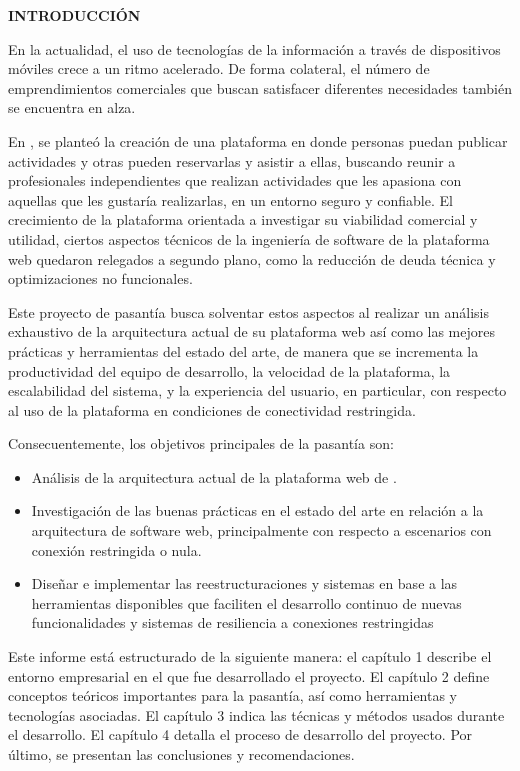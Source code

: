 \begin{center}
\textsc{\bfseries\uppercase{Introducción}}
\end{center}

En la actualidad, el uso de tecnologías de la información a través de dispositivos móviles crece a un ritmo acelerado. De forma colateral, el número de emprendimientos comerciales que buscan satisfacer diferentes necesidades también se encuentra en alza.

En \business, se planteó la creación de una plataforma en donde personas puedan publicar actividades y otras pueden reservarlas y asistir a ellas, buscando reunir a profesionales independientes que realizan actividades que les apasiona con aquellas que les gustaría realizarlas, en un entorno seguro y confiable. El crecimiento de la plataforma orientada a investigar su viabilidad comercial y utilidad, ciertos aspectos técnicos de la ingeniería de software de la plataforma web quedaron relegados a segundo plano, como la reducción de deuda técnica y optimizaciones no funcionales.

Este proyecto de pasantía busca solventar estos aspectos al realizar un análisis exhaustivo de la arquitectura actual de su plataforma web así como las mejores prácticas y herramientas del estado del arte, de manera que se incrementa la productividad del equipo de desarrollo, la velocidad de la plataforma, la escalabilidad del sistema, y la experiencia del usuario, en particular, con respecto al uso de la plataforma en condiciones de conectividad restringida.

Consecuentemente, los objetivos principales de la pasantía son:

\begin{itemize}
  \item Análisis de la arquitectura actual de la plataforma web de \business.
  \item Investigación de las buenas prácticas en el estado del arte en relación a la arquitectura de software web, principalmente con respecto a escenarios con conexión restringida o nula.
  \item Diseñar e implementar las reestructuraciones y sistemas en base a las herramientas disponibles que faciliten el desarrollo continuo de nuevas funcionalidades y sistemas de resiliencia a conexiones restringidas
\end{itemize}

Este informe está estructurado de la siguiente manera: el capítulo 1 describe el entorno empresarial en el que fue desarrollado el proyecto. El capítulo 2 define conceptos teóricos importantes para la pasantía, así como herramientas y tecnologías asociadas. El capítulo 3 indica las técnicas y métodos usados durante el desarrollo. El capítulo 4 detalla el proceso de desarrollo del proyecto. Por último, se presentan las conclusiones y recomendaciones.
